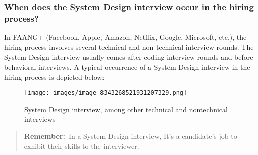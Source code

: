 \subsubsection{When does the System Design interview occur in the hiring process?}\label{When-does-the-System-Design-interview-occur-in-the-hiring-process}

In FAANG+ (Facebook, Apple, Amazon, Netflix, Google, Microsoft, etc.), the hiring process involves several technical and non-technical interview rounds. The System Design interview usually comes after coding interview rounds and before behavioral interviews. A typical occurrence of a System Design interview in the hiring process is depicted below:

\begin{figure}[htbp]
 \centering
 \texttt{[image: images/image\_8343268521931207329.png]}
 \caption{System Design interview, among other technical and nontechnical interviews}
\end{figure}

\begin{quote}
\textbf{Remember:}~In a System Design interview, It's a candidate's job to exhibit their skills to the interviewer.
\end{quote}

